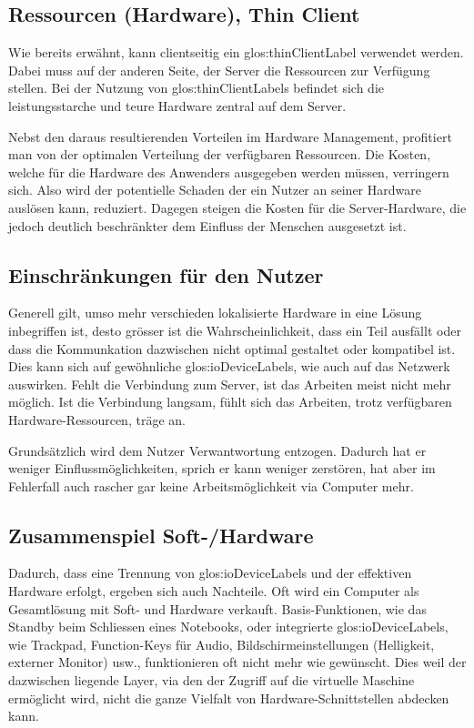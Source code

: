 \subsection{Ressourcen (Hardware), Thin Client}
Wie bereits erwähnt, kann clientseitig ein \gls{glos:thinClientLabel} verwendet werden. Dabei muss auf der anderen Seite, der Server die Ressourcen zur Verfügung stellen.
Bei der Nutzung von \glspl{glos:thinClientLabel} befindet sich die leistungsstarche und teure Hardware zentral auf dem Server.

Nebst den daraus resultierenden Vorteilen im Hardware Management, profitiert man von der optimalen Verteilung der verfügbaren Ressourcen.
Die Kosten, welche für die Hardware des Anwenders ausgegeben werden müssen, verringern sich.
Also wird der potentielle Schaden der ein Nutzer an seiner Hardware auslösen kann, reduziert.
Dagegen steigen die Kosten für die Server-Hardware, die jedoch deutlich beschränkter dem Einfluss der Menschen ausgesetzt ist.

\subsection{Einschränkungen für den Nutzer}
Generell gilt, umso mehr verschieden lokalisierte Hardware in eine Lösung inbegriffen ist, desto grösser ist die Wahrscheinlichkeit, dass ein Teil ausfällt oder dass die Kommunkation dazwischen nicht optimal gestaltet oder kompatibel ist.
Dies kann sich auf gewöhnliche \glspl{glos:ioDeviceLabel}, wie auch auf das Netzwerk auswirken.
Fehlt die Verbindung zum Server, ist das Arbeiten meist nicht mehr möglich.
Ist die Verbindung langsam, fühlt sich das Arbeiten, trotz verfügbaren Hardware-Ressourcen, träge an.

Grundsätzlich wird dem Nutzer Verwantwortung entzogen. Dadurch hat er weniger Einflussmöglichkeiten, sprich er kann weniger zerstören, hat aber im Fehlerfall auch rascher gar keine Arbeitsmöglichkeit via Computer mehr.

\subsection{Zusammenspiel Soft-/Hardware}
Dadurch, dass eine Trennung von \glspl{glos:ioDeviceLabel} und der effektiven Hardware erfolgt, ergeben sich auch Nachteile.
Oft wird ein Computer als Gesamtlösung mit Soft- und Hardware verkauft.
Basis-Funktionen, wie das Standby beim Schliessen eines Notebooks, oder integrierte \glspl{glos:ioDeviceLabel}, wie Trackpad, Function-Keys für Audio, Bildschirmeinstellungen (Helligkeit, externer Monitor) usw., funktionieren oft nicht mehr wie gewünscht.
Dies weil der dazwischen liegende Layer, via den der Zugriff auf die virtuelle Maschine ermöglicht wird,  nicht die ganze Vielfalt von Hardware-Schnittstellen abdecken kann.

